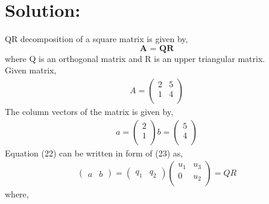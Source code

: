 \documentclass{article}
\begin{document}
\section*{Solution: }
QR decomposition of a square matrix is given by,
\begin{equation}
    \textbf{A = QR}
\end{equation}
where Q is an orthogonal matrix and R is an
upper triangular matrix. \\
Given matrix,\\
\begin{align}
    A = \begin{pmatrix}
    2 & 5 \\ 1 & 4\\
    \end{pmatrix}
\end{align}
The column vectors of the matrix is given by, \\
\begin{align}
    a = \begin{pmatrix}
    2 \\ 1 \\
    \end{pmatrix} 
    b = \begin{pmatrix}
    5 \\ 4\\
    \end{pmatrix}
\end{align}
Equation (22) can be written in form of
(23) as, \\
\begin{gather}
    \begin{pmatrix}
a & b
\end{pmatrix} = \begin{pmatrix}
q_1 & q_2
\end{pmatrix}\begin{pmatrix}
u_1 & u_3 \\ 0 & u_2 \\
\end{pmatrix} = QR
\end{gather}
where,\\
\end{document}
